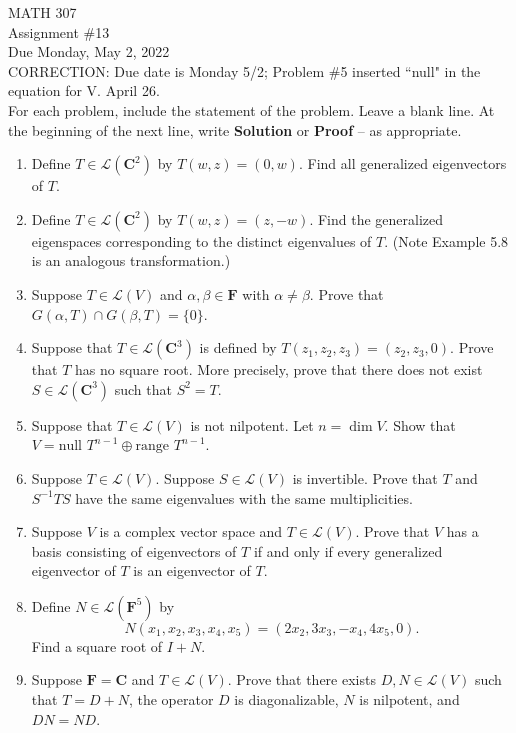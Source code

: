 \documentclass[12pt]{article}
\begin{document}
\noindent MATH 307 \\
Assignment \#13 \\
Due Monday, May 2, 2022 \\ CORRECTION: Due date is Monday 5/2; Problem \#5 inserted ``null" in the equation for V. April 26.\\

For each problem, include the statement of the problem. Leave a blank line.  At the beginning of the next line, write \textbf{Solution} or \textbf{Proof} -- as appropriate.

\begin{enumerate}
\item Define $T \in \mathcal{L}(\mathbf{C}^2)$ by $T(w,z) =  (0,w)$.  Find all generalized eigenvectors of $T$.

\item Define $T \in\mathcal{L}(\mathbf{C}^2)$ by $T(w,z) = (z,-w)$. Find the generalized eigenspaces corresponding to the distinct eigenvalues of $T$. (Note Example 5.8 is an analogous transformation.)

\item Suppose $T \in \mathcal{L}(V)$ and $\alpha , \beta \in \mathbf{F}$ with $\alpha \ne \beta$.  Prove that $G(\alpha, T) \cap G(\beta,T) = \{ 0 \}$.

\item Suppose that $T \in \mathcal{L}(\mathbf{C}^3)$ is defined by $T(z_1,z_2,z_3) = (z_2,z_3,0)$. Prove that $T$ has no square root.  More precisely, prove that there does not exist $S \in \mathcal{L}(\mathbf{C}^3)$ such that $S^2 = T$.

\item Suppose that $T \in \mathcal{L}(V)$ is not nilpotent.  Let $n = \dim V$.  Show that \\ $V = \text{null }T^{n-1} \oplus \text{range }T^{n-1}$.

\item Suppose $T \in \mathcal{L}(V)$. Suppose $S \in \mathcal{L}(V)$ is invertible.  Prove that $T$ and $S^{-1}TS$ have the same eigenvalues with the same multiplicities.

\item Suppose $V$ is a complex vector space and $T \in \mathcal{L}(V)$.  Prove that $V$ has a basis consisting of eigenvectors of $T$ if and only if every generalized eigenvector of $T$ is an eigenvector of $T$.

\item Define $N \in \mathcal{L}(\mathbf{F}^5)$ by
    \[
       N(x_1,x_2,x_3,x_4,x_5) = (2x_2,3x_3,-x_4,4x_5,0).
    \]
    Find a square root of $I+N$.

\item Suppose $\mathbf{F} = \mathbf{C}$ and $T \in \mathcal{L}(V)$.  Prove that there exists $D, N \in  \mathcal{L}(V)$ such that $T = D + N$, the operator $D$ is diagonalizable, $N$ is nilpotent, and $DN = ND$.
\end{enumerate}
\end{document}
